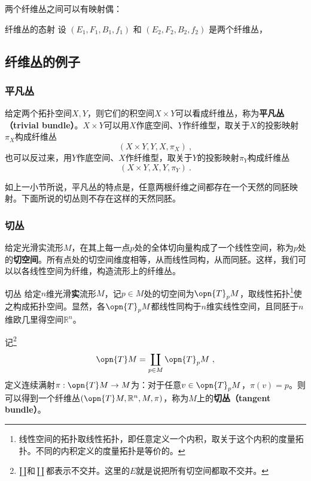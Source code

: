 两个纤维丛之间可以有映射偶：

\begin{definition}{纤维丛的态射}
设 $(E_1, F_1, B_1, f_1)$ 和 $(E_2, F_2, B_2, f_2)$ 是两个纤维丛，
\end{definition}

\subsection{纤维丛的例子}

\subsubsection{平凡丛}


给定两个拓扑空间$X, Y$，则它们的积空间$X\times Y$可以看成纤维丛，称为\textbf{平凡丛（trivial bundle）}。$X\times Y$可以用$X$作底空间、$Y$作纤维型，取关于$X$的投影映射$\pi_X$构成纤维丛
\begin{equation}
(X\times Y, Y, X, \pi_X)~, 
\end{equation}
也可以反过来，用$Y$作底空间、$X$作纤维型，取关于$Y$的投影映射$\pi_Y$构成纤维丛
\begin{equation}
(X\times Y, X, Y, \pi_Y)~. 
\end{equation}


如上一小节所说，平凡丛的特点是，任意两根纤维之间都存在一个天然的同胚映射。下面所说的切丛则不存在这样的天然同胚。


\subsubsection{切丛}



给定光滑实流形$M$，在其上每一点$p$处的全体切向量构成了一个线性空间，称为$p$处的\textbf{切空间}。所有点处的切空间维度相等，从而线性同构，从而同胚。这样，我们可以以各线性空间为纤维，构造流形上的纤维丛。


\begin{definition}{切丛}
给定$n$维光滑\textbf{实}流形$M$，记$p\in M$处的切空间为$\opn{T}_p M$，取线性拓扑\footnote{线性空间的拓扑取线性拓扑，即任意定义一个内积，取关于这个内积的度量拓扑。不同的内积定义的度量拓扑是等价的。}使之构成拓扑空间。显然，各$\opn{T}_pM$都线性同构于$n$维实线性空间，且同胚于$n$维欧几里得空间$\mathbb{R}^n$。

记\footnote{$\amalg$和$\coprod$都表示不交并。这里的$E$就是说把所有切空间都取不交并。}
\begin{equation}
\opn{T}M= \coprod_{p\in M}\opn{T}_p M~, 
\end{equation}
定义连续满射$\pi:\opn{T}M\to M$为：对于任意$v\in \opn{T}_p M$，$\pi(v)=p$。则可以得到一个纤维丛$(\opn{T}M, \mathbb{R}^n, M, \pi)$，称为$M$上的\textbf{切丛（tangent bundle）}。

\end{definition}





